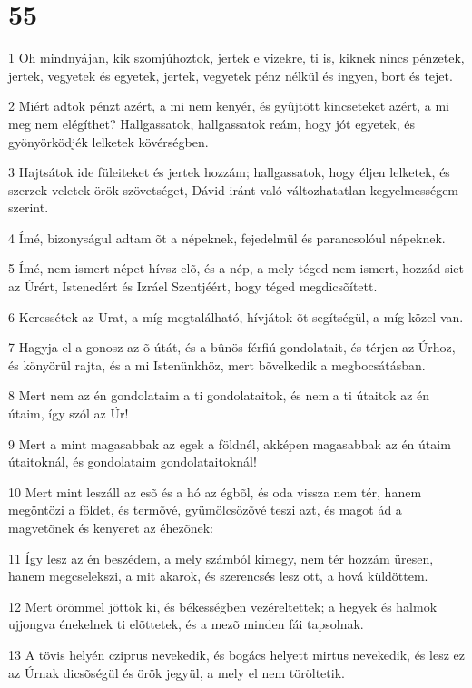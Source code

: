 \chapter{55}

\par 1 Oh mindnyájan, kik szomjúhoztok, jertek e vizekre, ti is, kiknek nincs pénzetek, jertek, vegyetek és egyetek, jertek, vegyetek pénz nélkül és ingyen, bort és tejet.
\par 2 Miért adtok pénzt azért, a mi nem kenyér, és gyûjtött kincseteket azért, a mi meg nem elégíthet? Hallgassatok, hallgassatok reám, hogy jót egyetek, és gyönyörködjék lelketek kövérségben.
\par 3 Hajtsátok ide füleiteket és jertek hozzám; hallgassatok, hogy éljen lelketek, és szerzek veletek örök szövetséget, Dávid iránt való változhatatlan kegyelmességem szerint.
\par 4 Ímé, bizonyságul adtam õt a népeknek, fejedelmül és parancsolóul népeknek.
\par 5 Ímé, nem ismert népet hívsz elõ, és a nép, a mely téged nem ismert, hozzád siet az Úrért, Istenedért és Izráel Szentjéért, hogy téged megdicsõített.
\par 6 Keressétek az Urat, a míg megtalálható, hívjátok õt segítségül, a míg közel van.
\par 7 Hagyja el a gonosz az õ útát, és a bûnös férfiú gondolatait, és térjen az Úrhoz, és könyörül rajta, és a mi Istenünkhöz, mert bõvelkedik a megbocsátásban.
\par 8 Mert nem az én gondolataim a ti gondolataitok, és nem a ti útaitok az én útaim, így szól az Úr!
\par 9 Mert a mint magasabbak az egek a földnél, akképen magasabbak az én útaim útaitoknál, és gondolataim gondolataitoknál!
\par 10 Mert mint leszáll az esõ és a hó az égbõl, és oda vissza nem tér, hanem megöntözi a földet, és termõvé, gyümölcsözõvé teszi azt, és magot ád a magvetõnek és kenyeret az éhezõnek:
\par 11 Így lesz az én beszédem, a mely számból kimegy, nem tér hozzám üresen, hanem megcselekszi, a mit akarok, és szerencsés lesz ott, a hová küldöttem.
\par 12 Mert örömmel jöttök ki, és békességben vezéreltettek; a hegyek és halmok ujjongva énekelnek ti elõttetek, és a mezõ minden fái tapsolnak.
\par 13 A tövis helyén cziprus nevekedik, és bogács helyett mirtus nevekedik, és lesz ez az Úrnak dicsõségül és örök jegyül, a mely el nem töröltetik.

